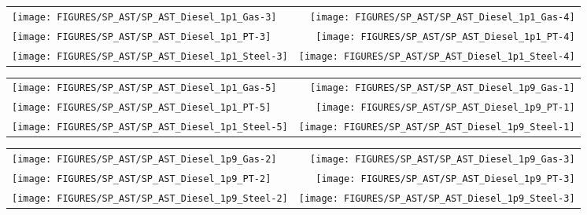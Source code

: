 \begin{figure}[p]
\begin{tabular*}{\textwidth}{l@{\extracolsep{\fill}}r}
\texttt{[image: FIGURES/SP\_AST/SP\_AST\_Diesel\_1p1\_Gas-3]}   &  \texttt{[image: FIGURES/SP\_AST/SP\_AST\_Diesel\_1p1\_Gas-4]}   \\
\texttt{[image: FIGURES/SP\_AST/SP\_AST\_Diesel\_1p1\_PT-3]}    &  \texttt{[image: FIGURES/SP\_AST/SP\_AST\_Diesel\_1p1\_PT-4]}    \\
\texttt{[image: FIGURES/SP\_AST/SP\_AST\_Diesel\_1p1\_Steel-3]} &  \texttt{[image: FIGURES/SP\_AST/SP\_AST\_Diesel\_1p1\_Steel-4]}
\end{tabular*}
\label{SP_Diesel_1p1_3m}
\end{figure}

\begin{figure}[p]
\begin{tabular*}{\textwidth}{l@{\extracolsep{\fill}}r}
\texttt{[image: FIGURES/SP\_AST/SP\_AST\_Diesel\_1p1\_Gas-5]}   &  \texttt{[image: FIGURES/SP\_AST/SP\_AST\_Diesel\_1p9\_Gas-1]}   \\
\texttt{[image: FIGURES/SP\_AST/SP\_AST\_Diesel\_1p1\_PT-5]}    &  \texttt{[image: FIGURES/SP\_AST/SP\_AST\_Diesel\_1p9\_PT-1]}    \\
\texttt{[image: FIGURES/SP\_AST/SP\_AST\_Diesel\_1p1\_Steel-5]} &  \texttt{[image: FIGURES/SP\_AST/SP\_AST\_Diesel\_1p9\_Steel-1]}
\end{tabular*}
\label{SP_Diesel_1p1_5m}
\end{figure}

\begin{figure}[p]
\begin{tabular*}{\textwidth}{l@{\extracolsep{\fill}}r}
\texttt{[image: FIGURES/SP\_AST/SP\_AST\_Diesel\_1p9\_Gas-2]}   &  \texttt{[image: FIGURES/SP\_AST/SP\_AST\_Diesel\_1p9\_Gas-3]}   \\
\texttt{[image: FIGURES/SP\_AST/SP\_AST\_Diesel\_1p9\_PT-2]}    &  \texttt{[image: FIGURES/SP\_AST/SP\_AST\_Diesel\_1p9\_PT-3]}    \\
\texttt{[image: FIGURES/SP\_AST/SP\_AST\_Diesel\_1p9\_Steel-2]} &  \texttt{[image: FIGURES/SP\_AST/SP\_AST\_Diesel\_1p9\_Steel-3]}
\end{tabular*}
\label{SP_Diesel_1p9_2m}
\end{figure}

